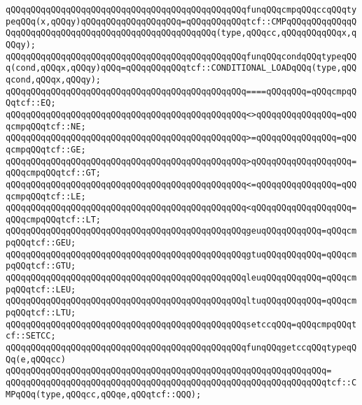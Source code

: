 \newline
\verb|qQQqqQQqqQQqqQQqqQQqqQQqqQQqqQQqqQQqqQQqqQQqqQQqfunqQQqcmpqQQqccqQQqtypeqQQq(x,qQQqy)qQQqqQQqqQQqqQQqqQQq=qQQqqQQqqQQqtcf::CMPqQQqqQQqqQQqqQQqqQQqqQQqqQQqqQQqqQQqqQQqqQQqqQQqqQQqqQQq(type,qQQqcc,qQQqqQQqqQQqx,qQQqy);|\newline
\verb|qQQqqQQqqQQqqQQqqQQqqQQqqQQqqQQqqQQqqQQqqQQqqQQqfunqQQqcondqQQqtypeqQQq(cond,qQQqx,qQQqy)qQQq=qQQqqQQqqQQqtcf::CONDITIONAL_LOADqQQq(type,qQQqcond,qQQqx,qQQqy);|\newline
\newline
\verb|qQQqqQQqqQQqqQQqqQQqqQQqqQQqqQQqqQQqqQQqqQQqqQQq====qQQqqQQq=qQQqcmpqQQqtcf::EQ;|\newline
\verb|qQQqqQQqqQQqqQQqqQQqqQQqqQQqqQQqqQQqqQQqqQQqqQQq<>qQQqqQQqqQQqqQQq=qQQqcmpqQQqtcf::NE;|\newline
\verb|qQQqqQQqqQQqqQQqqQQqqQQqqQQqqQQqqQQqqQQqqQQqqQQq>=qQQqqQQqqQQqqQQq=qQQqcmpqQQqtcf::GE;|\newline
\verb|qQQqqQQqqQQqqQQqqQQqqQQqqQQqqQQqqQQqqQQqqQQqqQQq>qQQqqQQqqQQqqQQqqQQq=qQQqcmpqQQqtcf::GT;|\newline
\verb|qQQqqQQqqQQqqQQqqQQqqQQqqQQqqQQqqQQqqQQqqQQqqQQq<=qQQqqQQqqQQqqQQq=qQQqcmpqQQqtcf::LE;|\newline
\verb|qQQqqQQqqQQqqQQqqQQqqQQqqQQqqQQqqQQqqQQqqQQqqQQq<qQQqqQQqqQQqqQQqqQQq=qQQqcmpqQQqtcf::LT;|\newline
\verb|qQQqqQQqqQQqqQQqqQQqqQQqqQQqqQQqqQQqqQQqqQQqqQQqgeuqQQqqQQqqQQq=qQQqcmpqQQqtcf::GEU;|\newline
\verb|qQQqqQQqqQQqqQQqqQQqqQQqqQQqqQQqqQQqqQQqqQQqqQQqgtuqQQqqQQqqQQq=qQQqcmpqQQqtcf::GTU;|\newline
\verb|qQQqqQQqqQQqqQQqqQQqqQQqqQQqqQQqqQQqqQQqqQQqqQQqleuqQQqqQQqqQQq=qQQqcmpqQQqtcf::LEU;|\newline
\verb|qQQqqQQqqQQqqQQqqQQqqQQqqQQqqQQqqQQqqQQqqQQqqQQqltuqQQqqQQqqQQq=qQQqcmpqQQqtcf::LTU;|\newline
\verb|qQQqqQQqqQQqqQQqqQQqqQQqqQQqqQQqqQQqqQQqqQQqqQQqsetccqQQq=qQQqcmpqQQqtcf::SETCC;|\newline
\newline
\verb|qQQqqQQqqQQqqQQqqQQqqQQqqQQqqQQqqQQqqQQqqQQqqQQqfunqQQqgetccqQQqtypeqQQq(e,qQQqcc)|\newline
\verb|qQQqqQQqqQQqqQQqqQQqqQQqqQQqqQQqqQQqqQQqqQQqqQQqqQQqqQQqqQQqqQQq=|\newline
\verb|qQQqqQQqqQQqqQQqqQQqqQQqqQQqqQQqqQQqqQQqqQQqqQQqqQQqqQQqqQQqqQQqtcf::CMPqQQq(type,qQQqcc,qQQqe,qQQqtcf::QQQ);|\newline

